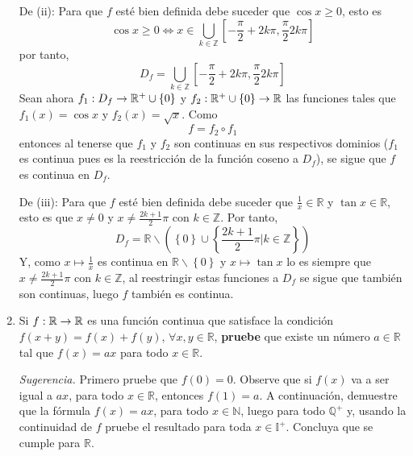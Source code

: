 \documentclass[12pt]{article}
\begin{document}
\begin{enumerate}
\begin{sol}
        De (ii): Para que $f$ esté bien definida debe suceder que $\cos x\geq 0$, esto es
        \begin{equation*}
            \cos x\geq 0\iff x\in\bigcup_{ k\in\mathbb{Z}}\left[-\frac{\pi}{2}+2k\pi,\frac{\pi}{2}2k\pi\right]
        \end{equation*}
        por tanto,
        \begin{equation*}
            D_f=\bigcup_{ k\in\mathbb{Z}}\left[-\frac{\pi}{2}+2k\pi,\frac{\pi}{2}2k\pi\right]
        \end{equation*}
        Sean ahora $f_1:D_f\rightarrow\mathbb{R}^+\cup\left\{0\right\}$ y $f_2:\mathbb{R}^+\cup\left\{0\right\}\rightarrow\mathbb{R}$ las funciones tales que $f_1(x)=\cos x$ y $f_2(x)=\sqrt{x}$. Como
        \begin{equation*}
            f=f_2\circ f_1
        \end{equation*}
        entonces al tenerse que $f_1$ y $f_2$ son continuas en sus respectivos dominios ($f_1$ es continua pues es la reestricción de la función coseno a $D_f$), se sigue que $f$ es continua en $D_f$.

        De (iii): Para que $f$ esté bien definida debe suceder que $\frac{1}{x}\in\mathbb{R}$ y $\tan x\in\mathbb{R}$, esto es que
        $x\neq 0$ y $x\neq\frac{2k+1}{2}\pi$ con $k\in\mathbb{Z}$. Por tanto,
        \begin{equation*}
            D_f=\mathbb{R}\backslash\left(\left\{0\right\}\cup\left\{\frac{2k+1}{2}\pi\Big|k\in\mathbb{Z}\right\}\right)
        \end{equation*}
        Y, como $x\mapsto\frac{1}{x}$ es continua en $\mathbb{R}\backslash\left\{0 \right\}$ y $x\mapsto\tan x$ lo es siempre que $x\neq\frac{2k+1}{2}\pi$ con $k\in\mathbb{Z}$, al reestringir estas funciones a $D_f$ se sigue que también son continuas, luego $f$ también es continua.
    \end{sol}

    \item Si $f:\mathbb{R}\rightarrow\mathbb{R}$ es una función continua que satisface la condición $f(x+y)=f(x)+f(y)$, $\forall x,y\in\mathbb{R}$, \textbf{pruebe} que existe un número $a\in\mathbb{R}$ tal que $f(x)=ax$ para todo $x\in\mathbb{R}$.

    \textit{Sugerencia.} Primero pruebe que $f(0)=0$. Observe que si $f(x)$ va a ser igual a $ax$, para todo $x\in\mathbb{R}$, entonces $f(1)=a$. A continuación, demuestre que la fórmula $f(x)=ax$, para todo $x\in\mathbb{N}$, luego para todo $\mathbb{Q}^+$ y, usando la continuidad de $f$ pruebe el resultado para toda $x\in\mathbb{I}^+$. Concluya que se cumple para $\mathbb{R}$.


\end{enumerate}
\end{document}
